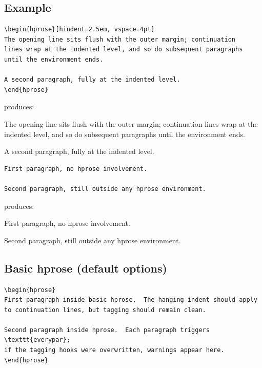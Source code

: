 \documentclass[11pt, twoside, openany]{article}
\begin{document}
\subsection*{Example}\label{subsec:examples}

\begin{verbatim}
\begin{hprose}[hindent=2.5em, vspace=4pt]
The opening line sits flush with the outer margin; continuation
lines wrap at the indented level, and so do subsequent paragraphs
until the environment ends.

A second paragraph, fully at the indented level.
\end{hprose}
\end{verbatim}

\noindent produces:

\begin{hprose}[hindent=2.5em, vspace=4pt]
The opening line sits flush with the outer margin; continuation
lines wrap at the indented level, and so do subsequent paragraphs
until the environment ends. \lipsum[1][1-3]

A second paragraph, fully at the indented level. \lipsum[2][1-3]
\end{hprose}

\begin{verbatim}
First paragraph, no hprose involvement.

Second paragraph, still outside any hprose environment.
\end{verbatim}

\noindent produces:

First paragraph, no hprose involvement.

Second paragraph, still outside any hprose environment.

\subsection*{Basic hprose (default options)}

\begin{verbatim}
\begin{hprose}
First paragraph inside basic hprose.  The hanging indent should apply
to continuation lines, but tagging should remain clean.

Second paragraph inside hprose.  Each paragraph triggers \texttt{everypar};
if the tagging hooks were overwritten, warnings appear here.
\end{hprose}
\end{verbatim}
\end{document}
